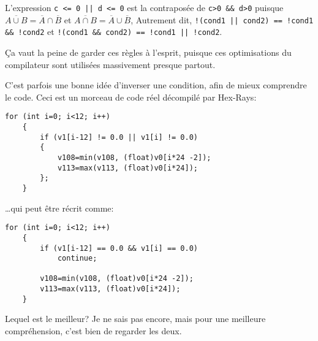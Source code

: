 L'expression \verb~c <= 0 || d <= 0~ est la contraposée de \verb|c>0 && d>0| puisque
$\overline{A \cup B} = \overline{A} \cap \overline{B}$ et
$\overline{A \cap B} = \overline{A} \cup \overline{B}$,
Autrement dit,
\verb~!(cond1 || cond2) == !cond1 && !cond2~ et \verb~!(cond1 && cond2) == !cond1 || !cond2~.

Ça vaut la peine de garder ces règles à l'esprit, puisque ces optimisations du
compilateur sont utilisées massivement presque partout.

C'est parfois une bonne idée d'inverser une condition, afin de mieux comprendre
le code.
Ceci est un morceau de code réel décompilé par Hex-Rays:

\begin{lstlisting}[style=customc]
	for (int i=0; i<12; i++)
	{
		if (v1[i-12] != 0.0 || v1[i] != 0.0)
		{
			v108=min(v108, (float)v0[i*24 -2]);
			v113=max(v113, (float)v0[i*24]);
		};
	}
\end{lstlisting}

\dots qui peut être récrit comme:

\begin{lstlisting}[style=customc]
	for (int i=0; i<12; i++)
	{
		if (v1[i-12] == 0.0 && v1[i] == 0.0)
			continue;

		v108=min(v108, (float)v0[i*24 -2]);
		v113=max(v113, (float)v0[i*24]);
	}
\end{lstlisting}

Lequel est le meilleur? Je ne sais pas encore, mais pour une meilleure compréhension,
c'est bien de regarder les deux.

